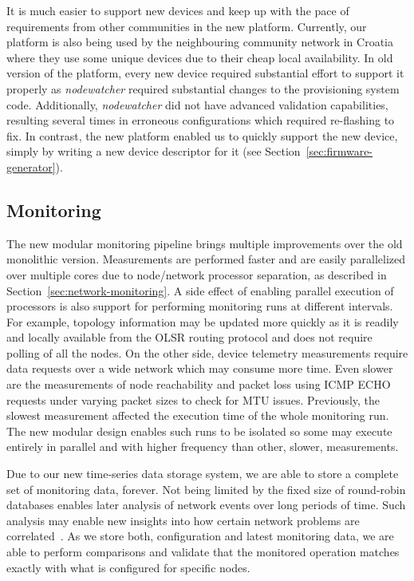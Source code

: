 \documentclass[5p,sort&compress]{elsarticle}
\newcommand{\nodewatcher}{\textit{nodewatcher}}
\begin{document}
It is much easier to support new devices and keep up with the pace of requirements from other communities in the new platform.
Currently, our platform is also being used by the neighbouring community network in Croatia where they use some unique devices due to their cheap local availability.
In old version of the platform, every new device required substantial effort to support it properly as \nodewatcher{} required substantial changes to the provisioning system code.
Additionally, \nodewatcher{} did not have advanced validation capabilities, resulting several times in erroneous configurations which required re-flashing to fix.
In contrast, the new platform enabled us to quickly support the new device, simply by writing a new device descriptor for it (see Section~\ref{sec:firmware-generator}).

\subsection{Monitoring}

The new modular monitoring pipeline brings multiple improvements over the old monolithic version.
Measurements are performed faster and are easily parallelized over multiple cores due to node/network processor separation, as described in Section~\ref{sec:network-monitoring}.
A side effect of enabling parallel execution of processors is also support for performing monitoring runs at different intervals.
For example, topology information may be updated more quickly as it is readily and locally available from the OLSR routing protocol and does not require polling of all the nodes.
On the other side, device telemetry measurements require data requests over a wide network which may consume more time.
Even slower are the measurements of node reachability and packet loss using ICMP ECHO requests under varying packet sizes to check for MTU issues.
Previously, the slowest measurement affected the execution time of the whole monitoring run.
The new modular design enables such runs to be isolated so some may execute entirely in parallel and with higher frequency than other, slower, measurements.

Due to our new time-series data storage system, we are able to store a complete set of monitoring data, forever.
Not being limited by the fixed size of round-robin databases enables later analysis of network events over long periods of time.
Such analysis may enable new insights into how certain network problems are correlated~\cite{Steinder_2004}.
As we store both, configuration and latest monitoring data, we are able to perform comparisons and validate that the monitored operation matches exactly with what is configured for specific nodes.
\end{document}
